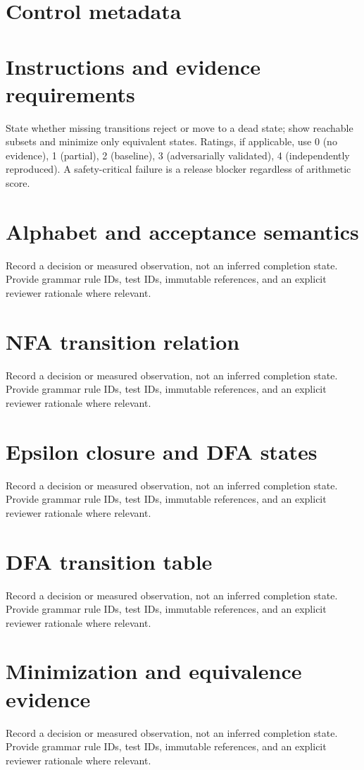 \documentclass[11pt,letterpaper]{article}
\begin{document}
\makedoctitle\makedocsummary
\tableofcontents\clearpage
\section{Control metadata}
\section{Instructions and evidence requirements}
State whether missing transitions reject or move to a dead state; show reachable subsets and minimize only equivalent states. Ratings, if applicable, use 0 (no evidence), 1 (partial), 2 (baseline), 3 (adversarially validated), 4 (independently reproduced). A safety-critical failure is a release blocker regardless of arithmetic score.
\section{Alphabet and acceptance semantics}
Record a decision or measured observation, not an inferred completion state. Provide grammar rule IDs, test IDs, immutable references, and an explicit reviewer rationale where relevant.
\section{NFA transition relation}
Record a decision or measured observation, not an inferred completion state. Provide grammar rule IDs, test IDs, immutable references, and an explicit reviewer rationale where relevant.
\section{Epsilon closure and DFA states}
Record a decision or measured observation, not an inferred completion state. Provide grammar rule IDs, test IDs, immutable references, and an explicit reviewer rationale where relevant.
\section{DFA transition table}
Record a decision or measured observation, not an inferred completion state. Provide grammar rule IDs, test IDs, immutable references, and an explicit reviewer rationale where relevant.
\section{Minimization and equivalence evidence}
Record a decision or measured observation, not an inferred completion state. Provide grammar rule IDs, test IDs, immutable references, and an explicit reviewer rationale where relevant.
\end{document}

